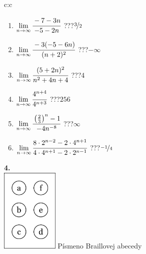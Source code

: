 \documentclass[10pt]{report}
\begin{document}
\begin{tabular}{c:c}
\begin{minipage}[c][104.5mm][t]{0.5\linewidth}
\begin{center}
\begin{minipage}{0.79\linewidth}
\begin{center}
\begin{varwidth}{\linewidth}
\begin{enumerate}
\normalsize
\item $\lim\limits_{n\to\infty}\cfrac{-7-3n}{-5-2n}$\quad \dotfill\; ???\;\dotfill \quad $\nicefrac{3}{2}$
\item $\lim\limits_{n\to\infty}\cfrac{-3(-5-6n)}{(n+2)^2}$\quad \dotfill\; ???\;\dotfill \quad $-\infty$
\item $\lim\limits_{n\to\infty}\cfrac{(5+2n)^2}{n^2+4n+4}$\quad \dotfill\; ???\;\dotfill \quad $4$
\item $\lim\limits_{n\to\infty}\cfrac{4^{n+4}}{4^{n+3}}$\quad \dotfill\; ???\;\dotfill \quad $256$
\item $\lim\limits_{n\to\infty}\cfrac{\left(\frac{2}{3}\right)^n -1}{-4n^{-8}}$\quad \dotfill\; ???\;\dotfill \quad $\infty$
\item $\lim\limits_{n\to\infty}\cfrac{8\cdot 2^{n-2}-2\cdot 4^{n+1}}{4\cdot 4^{n+1}-2\cdot 2^{n-1}}$\quad \dotfill\; ???\;\dotfill \quad $\nicefrac{-1}{4}$
\end{enumerate}
\end{varwidth}
\end{center}
\end{minipage}
\begin{minipage}{0.20\linewidth}
\begin{center}
{\Huge\bfseries 4.} \\[2mm]
\includegraphics[height=40mm]{../images/braille.png}
{\small Písmeno Braillovej abecedy}
\end{center}
\end{minipage}
\end{center}
\end{minipage}
%
\end{tabular}
\newpage
\thispagestyle{empty}
\end{document}
